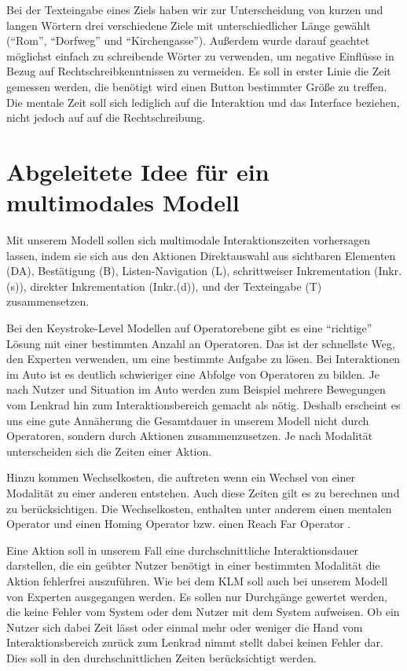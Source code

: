 Bei der Texteingabe eines Ziels haben wir zur Unterscheidung von kurzen und langen Wörtern drei verschiedene Ziele mit unterschiedlicher Länge gewählt ("`Rom"', "`Dorfweg"' und "`Kirchengasse"'). 
Außerdem wurde darauf geachtet möglichst einfach zu schreibende Wörter zu verwenden, um negative Einflüsse in Bezug auf Rechtschreibkenntnissen zu vermeiden. 
Es soll in erster Linie die Zeit gemessen werden, die benötigt wird einen Button bestimmter Größe zu treffen. 
Die mentale Zeit soll sich lediglich auf die Interaktion und das Interface beziehen, nicht jedoch auf auf die Rechtschreibung. 

\section[Idee des Modells]{Abgeleitete Idee für ein multimodales Modell}
Mit unserem Modell sollen sich multimodale Interaktionszeiten vorhersagen lassen, indem sie sich aus den Aktionen Direktauswahl aus sichtbaren Elementen (DA), Bestätigung (B), Listen-Navigation (L), schrittweiser Inkrementation (Inkr.(s)), direkter Inkrementation (Inkr.(d)), und der Texteingabe (T) zusammensetzen.

Bei den Keystroke-Level Modellen auf Operatorebene gibt es eine "`richtige"' Lösung mit einer bestimmten Anzahl an Operatoren. 
Das ist der schnellste Weg, den Experten verwenden, um eine bestimmte Aufgabe zu lösen. 
Bei Interaktionen im Auto ist es deutlich schwieriger eine Abfolge von Operatoren zu bilden. 
Je nach Nutzer und Situation im Auto werden zum Beispiel mehrere Bewegungen vom Lenkrad hin zum Interaktionsbereich gemacht als nötig. 
Deshalb erscheint es uns eine gute Annäherung die Gesamtdauer in unserem Modell nicht durch Operatoren, sondern durch Aktionen zusammenzusetzen. 
Je nach Modalität unterscheiden sich die Zeiten einer Aktion. 

Hinzu kommen Wechselkosten, die auftreten wenn ein Wechsel von einer Modalität zu einer anderen entstehen. 
Auch diese Zeiten gilt es zu berechnen und zu berücksichtigen.
Die Wechselkosten, enthalten unter anderem einen mentalen Operator und einen Homing Operator \citep{Card_1980} bzw. einen Reach Far Operator \citep{Green_2002}. 

Eine Aktion soll in unserem Fall eine durchschnittliche Interaktionsdauer darstellen, die ein geübter Nutzer benötigt in einer bestimmten Modalität die Aktion fehlerfrei auszuführen. 
Wie bei dem KLM soll auch bei unserem Modell von Experten ausgegangen werden. 
Es sollen nur Durchgänge gewertet werden, die keine Fehler vom System oder dem Nutzer mit dem System aufweisen.
Ob ein Nutzer sich dabei Zeit lässt oder einmal mehr oder weniger die Hand vom Interaktionsbereich zurück zum Lenkrad nimmt stellt dabei keinen Fehler dar.
Dies soll in den durchschnittlichen Zeiten berücksichtigt werden.
